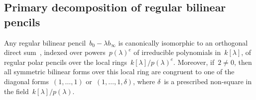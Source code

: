 \documentclass{amsart}
\DeclareMathOperator\Ker{Ker}
\begin{document}
% 
% 
% 
% 
\subsection{Primary decomposition of regular bilinear pencils}
\label{ss:bil-regular}

Any regular bilinear pencil~$b_0 - λ b_∞$ is canonically isomorphic to
an orthogonal direct sum~\cite[Theorem 4.2]{inventiones1976waterhouse},
indexed over powers~$p(λ)^e$ of irreducible polynomials in~$k[λ]$,
of regular polar pencils over the local rings~$k[λ]/p(λ)^e$.
Moreover, if~$2 ≠ 0$, then all symmetric bilinear forms over this local ring
are congruent to one of the diagonal forms~$(1,…,1)$ or~$(1,…,1,δ)$,
where $δ$~is a prescribed non-square in the field~$k[λ]/p(λ)$.
\end{document}
